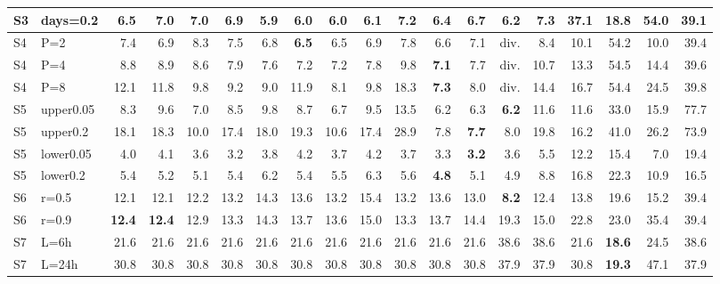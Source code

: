 \begin{tabular}{llrrrrrrrrrrrrrrrrr}
S3 & days=0.2 & 6.5 & 7.0 & 7.0 & 6.9 & \textbf{5.9} & 6.0 & 6.0 & 6.1 & 7.2 & 6.4 & 6.7 & 6.2 & 7.3 & 37.1 & 18.8 & 54.0 & 39.1 \\
\midrule
S4 & P=2 & 7.4 & 6.9 & 8.3 & 7.5 & 6.8 & \textbf{6.5} & 6.5 & 6.9 & 7.8 & 6.6 & 7.1 & div. & 8.4 & 10.1 & 54.2 & 10.0 & 39.4 \\
S4 & P=4 & 8.8 & 8.9 & 8.6 & 7.9 & 7.6 & 7.2 & 7.2 & 7.8 & 9.8 & \textbf{7.1} & 7.7 & div. & 10.7 & 13.3 & 54.5 & 14.4 & 39.6 \\
S4 & P=8 & 12.1 & 11.8 & 9.8 & 9.2 & 9.0 & 11.9 & 8.1 & 9.8 & 18.3 & \textbf{7.3} & 8.0 & div. & 14.4 & 16.7 & 54.4 & 24.5 & 39.8 \\
\midrule
S5 & upper0.05 & 8.3 & 9.6 & 7.0 & 8.5 & 9.8 & 8.7 & 6.7 & 9.5 & 13.5 & 6.2 & 6.3 & \textbf{6.2} & 11.6 & 11.6 & 33.0 & 15.9 & 77.7 \\
S5 & upper0.2 & 18.1 & 18.3 & 10.0 & 17.4 & 18.0 & 19.3 & 10.6 & 17.4 & 28.9 & 7.8 & \textbf{7.7} & 8.0 & 19.8 & 16.2 & 41.0 & 26.2 & 73.9 \\
S5 & lower0.05 & 4.0 & 4.1 & 3.6 & 3.2 & 3.8 & 4.2 & 3.7 & 4.2 & 3.7 & 3.3 & \textbf{3.2} & 3.6 & 5.5 & 12.2 & 15.4 & 7.0 & 19.4 \\
S5 & lower0.2 & 5.4 & 5.2 & 5.1 & 5.4 & 6.2 & 5.4 & 5.5 & 6.3 & 5.6 & \textbf{4.8} & 5.1 & 4.9 & 8.8 & 16.8 & 22.3 & 10.9 & 16.5 \\
\midrule
S6 & r=0.5 & 12.1 & 12.1 & 12.2 & 13.2 & 14.3 & 13.6 & 13.2 & 15.4 & 13.2 & 13.6 & 13.0 & \textbf{8.2} & 12.4 & 13.8 & 19.6 & 15.2 & 39.4 \\
S6 & r=0.9 & \textbf{12.4} & \textbf{12.4} & 12.9 & 13.3 & 14.3 & 13.7 & 13.6 & 15.0 & 13.3 & 13.7 & 14.4 & 19.3 & 15.0 & 22.8 & 23.0 & 35.4 & 39.4 \\
\midrule
S7 & L=6h & 21.6 & 21.6 & 21.6 & 21.6 & 21.6 & 21.6 & 21.6 & 21.6 & 21.6 & 21.6 & 21.6 & 38.6 & 38.6 & 21.6 & \textbf{18.6} & 24.5 & 38.6 \\
S7 & L=24h & 30.8 & 30.8 & 30.8 & 30.8 & 30.8 & 30.8 & 30.8 & 30.8 & 30.8 & 30.8 & 30.8 & 37.9 & 37.9 & 30.8 & \textbf{19.3} & 47.1 & 37.9 \\
\bottomrule
\end{tabular}
